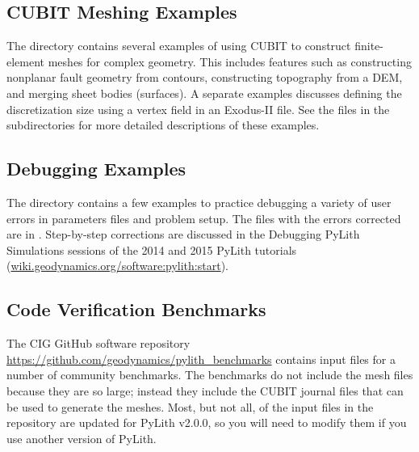 \subsection{CUBIT Meshing Examples}

The directory  contains several examples
of using CUBIT to construct finite-element meshes for complex geometry.
This includes features such as constructing nonplanar fault geometry
from contours, constructing topography from a DEM, and merging sheet
bodies (surfaces). A separate examples discusses defining the discretization
size using a vertex field in an Exodus-II file. See the 
files in the subdirectories for more detailed descriptions of these
examples.


\subsection{Debugging Examples}
\label{sub:debugging:examples}

The directory  contains a few examples to
practice debugging a variety of user errors in parameters files and
problem setup. The files with the errors corrected are in
.  Step-by-step corrections are
discussed in the Debugging PyLith Simulations sessions of the 2014 and
2015 PyLith tutorials
(\url{wiki.geodynamics.org/software:pylith:start}).


\subsection{Code Verification Benchmarks}

The CIG GitHub software repository \url{https://github.com/geodynamics/pylith_benchmarks}
contains input files for a number of community benchmarks. The benchmarks
do not include the mesh files because they are so large; instead they
include the CUBIT journal files that can be used to generate the meshes.
Most, but not all, of the input files in the repository are updated
for PyLith v2.0.0, so you will need to modify them if you use another
version of PyLith.

